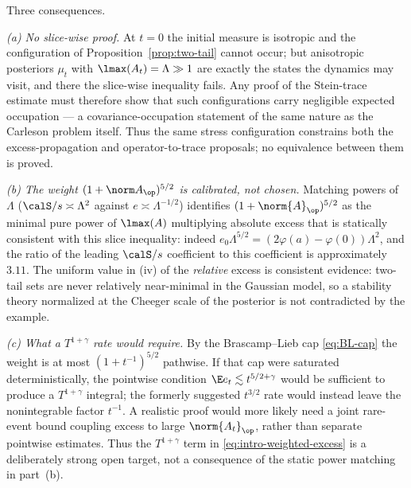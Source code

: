 \documentclass[../../main.tex]{subfiles}
\begin{document}
\begin{remark}
\label{rem:weight-explains-rate}
Three consequences.

\emph{(a) No slice-wise proof.} At $t=0$ the initial measure is isotropic and the configuration
of Proposition~\ref{prop:two-tail} cannot occur; but anisotropic posteriors
$\mu_t$ with $\lmax(A_t)=\Lambda\gg1$ are exactly the states the dynamics may visit, and there
the slice-wise inequality fails. Any proof of the Stein-trace estimate must therefore show that
such configurations carry negligible expected occupation --- a covariance-occupation statement
of the same nature as the Carleson problem itself. Thus the same stress configuration constrains
both the excess-propagation and operator-to-trace proposals; no equivalence between them is proved.

\emph{(b) The weight $(1+\norm A_\op)^{5/2}$ is calibrated, not chosen.} Matching powers of
$\Lambda$ ($\calS/s\asymp\Lambda^2$ against $e\asymp\Lambda^{-1/2}$) identifies
$(1+\norm{A}_\op)^{5/2}$ as the minimal pure power of $\lmax(A)$ multiplying absolute excess
that is statically consistent with this slice inequality: indeed
$e_0\Lambda^{5/2}=(2\varphi(a)-\varphi(0))\Lambda^2$, and the ratio of the leading
$\calS/s$ coefficient to this coefficient is approximately $3.11$. The
uniform value in (iv) of the \emph{relative} excess is consistent evidence: two-tail sets
are never relatively near-minimal in the Gaussian model, so a stability theory normalized at
the Cheeger scale of the posterior is not contradicted by the example.

\emph{(c) What a $T^{1+\gamma}$ rate would require.} By the Brascamp--Lieb cap
\eqref{eq:BL-cap} the weight is at most $(1+t^{-1})^{5/2}$ pathwise. If that cap were saturated
deterministically, the pointwise condition $\E e_t\lesssim t^{5/2+\gamma}$ would be sufficient to
produce a $T^{1+\gamma}$ integral; the formerly suggested $t^{3/2}$ rate would instead leave the
nonintegrable factor $t^{-1}$. A realistic proof would more likely need a joint rare-event bound
coupling excess to large $\norm{A_t}_\op$, rather than separate pointwise estimates. Thus the
$T^{1+\gamma}$ term in \eqref{eq:intro-weighted-excess} is a deliberately strong open target,
not a consequence of the static power matching in part~(b).
\end{remark}
\end{document}
